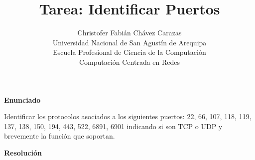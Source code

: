 \documentclass[a4paper,12pt]{article}
\begin{document}
\title{Tarea: Identificar Puertos}
\author{
Christofer Fabián Chávez Carazas \\
\small{Universidad Nacional de San Agustín de Arequipa} \\
\small{Escuela Profesional de Ciencia de la Computación} \\
\small{Computación Centrada en Redes}
}
\date{}

\maketitle

\begin{large}
 \textbf{Enunciado}
\end{large}

  Identificar los protocolos asociados a los siguientes puertos: 22, 66, 107, 118, 119, 137, 138, 150, 194, 443, 522,
6891, 6901 indicando si son TCP o UDP y brevemente la función que soportan.

\begin{large}
 \textbf{Resolución}
\end{large}
\end{document}
